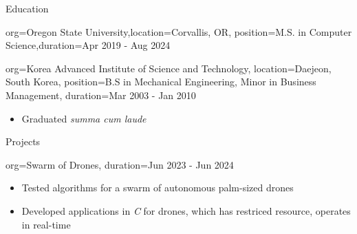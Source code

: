 \documentclass{resume}
\begin{document}
\begin{ResumeSection}{Education}
    \begin{ResumeSubsection}{org={Oregon State University},location={Corvallis, OR}, position={M.S. in Computer Science},duration={Apr 2019 - Aug 2024}}
    \end{ResumeSubsection}
    

    \begin{ResumeSubsection}{org={Korea Advanced Institute of Science and Technology}, location={Daejeon, South Korea}, position={B.S in Mechanical Engineering, Minor in Business Management}, duration={Mar 2003 - Jan 2010}}
        \begin{itemize}
            \item Graduated \textit{summa cum laude}
        \end{itemize}
    \end{ResumeSubsection}
\end{ResumeSection}

\begin{ResumeSection}{Projects}
    \begin{ResumeSubsection}{org={Swarm of Drones}, duration={Jun 2023 - Jun 2024}}
        \begin{itemize}
            \item Tested algorithms for a swarm of autonomous palm-sized drones
            \item Developed applications in \textit{C} for drones, which has restriced resource, operates in real-time
        \end{itemize}
    \end{ResumeSubsection}
\end{ResumeSection}
\end{document}
